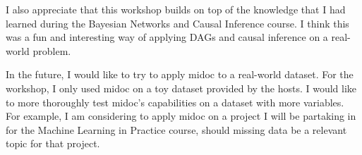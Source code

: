 \documentclass{IEEEtran}
\begin{document}
I also appreciate that this workshop builds on top of the knowledge that I had learned during the Bayesian Networks and Causal Inference course.
I think this was a fun and interesting way of applying DAGs and causal inference on a real-world problem.

In the future, I would like to try to apply midoc to a real-world dataset.
For the workshop, I only used midoc on a toy dataset provided by the hosts.
I would like to more thoroughly test midoc's capabilities on a dataset with more variables.
For example, I am considering to apply midoc on a project I will be partaking in for the Machine Learning in Practice course, should missing data be a relevant topic for that project.
\end{document}
